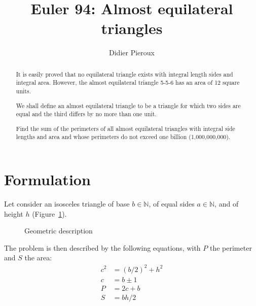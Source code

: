\documentclass[11pt, twoside, a4paper]{article}
\newcommand{\Figure}[1]{Figure~\ref{#1}}
\newcommand{\set}[1]{\mathbb{#1}}
\begin{document}
\title{Euler 94: Almost equilateral triangles}
\date{}
\author{Didier Pieroux}
\maketitle

\begin{abstract}
It is easily proved that no equilateral triangle exists with integral length sides and integral area. However, the almost equilateral triangle 5-5-6 has an area of 12 square units.

We shall define an almost equilateral triangle to be a triangle for which two sides are equal and the third differs by no more than one unit.

Find the sum of the perimeters of all almost equilateral triangles with integral side lengths and area and whose perimeters do not exceed one billion (1,000,000,000).
\end{abstract}

\section{Formulation}
Let consider an isosceles triangle of base $b\in\set N$, of equal sides $a\in\set N$, and of height $h$ (\Figure{fig:triangle1}).
  
\begin{figure}[h]
    \begin{center}
        \caption{Geometric description}
        \label{fig:triangle1}
    \end{center}
\end{figure}

The problem is then described by the following equations, with $P$ the perimeter and $S$ the area:
\begin{align}
    c^2 & = (b/2)^2 + h^2 \\ \label{eq:pytha1}
    c & = b \pm 1 \\ \label{eq:ab}
    P & = 2c+b \\ 
    S & = bh/2 \\ \label{eq:S1}
\end{align} 
    
\end{document}
